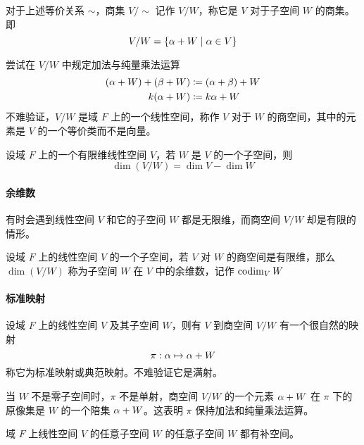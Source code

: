 对于上述等价关系 $\sim$，商集 $V/\sim$ 记作 $V/W$，称它是 $V$ 对于子空间 $W$ 的商集。即
\[ V/W = \{ \alpha + W \mid \alpha \in V \} \]

尝试在 $V/W$ 中规定加法与纯量乘法运算
\begin{equation*}
    \begin{aligned}
        (\alpha + W) + (\beta + W) &\coloneqq (\alpha + \beta) + W\\
        k(\alpha + W) &\coloneqq k\alpha + W
    \end{aligned}
\end{equation*}
不难验证，$V/W$ 是域 $F$ 上的一个线性空间，称作 $V$ 对于 $W$ 的商空间，其中的元素是 $V$ 的一个等价类而不是向量。

\begin{theorem}
    设域 $F$ 上的一个有限维线性空间 $V$，若 $W$ 是 $V$ 的一个子空间，则
    \[ \dim(V/W) = \dim V - \dim W \]
\end{theorem}

\paragraph{余维数}

有时会遇到线性空间 $V$ 和它的子空间 $W$ 都是无限维，而商空间 $V/W$ 却是有限的情形。

\begin{definition}[余维数]
    设域 $F$ 上的线性空间 $V$ 的一个子空间，若 $V$ 对 $W$ 的商空间是有限维，那么 $\dim(V/W)$ 称为子空间 $W$ 在 $V$ 中的余维数，记作 $\operatorname{codim}_V W$
\end{definition}

\paragraph{标准映射}

设域 $F$ 上的线性空间 $V$ 及其子空间 $W$，则有 $V$ 到商空间 $V/W$ 有一个很自然的映射
\[ \pi : \alpha \mapsto \alpha + W \]
称它为标准映射或典范映射。不难验证它是满射。

当 $W$ 不是零子空间时，$\pi$ 不是单射，商空间 $V/W$ 的一个元素 $\alpha + W$ 在 $\pi$ 下的原像集是 $W$ 的一个陪集 $\alpha + W$。这表明 $\pi$ 保持加法和纯量乘法运算。

\begin{theorem}
    域 $F$ 上线性空间 $V$ 的任意子空间 $W$ 的任意子空间 $W$ 都有补空间。
\end{theorem}



